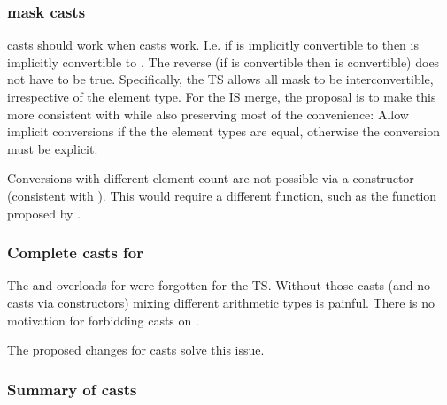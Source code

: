 \subsubsection{mask casts}
 casts should work when  casts work.
I.e. if  is implicitly convertible to 
then  is implicitly convertible to .
The reverse (if  is convertible then  is
convertible) does not have to be true.
Specifically, the TS allows all  mask to be
interconvertible, irrespective of the element type.
For the IS merge, the proposal is to make this more consistent with 
while also preserving most of the convenience:
Allow implicit conversions if the  the element types are equal,
otherwise the conversion must be explicit.

Conversions with different element count are not possible via a constructor
(consistent with ).
This would require a different function, such as the 
function proposed by \textcite{P2638R0}.

\subsubsection{Complete casts for }
The  and  overloads for  were forgotten for the TS.
Without those casts (and no casts via constructors) mixing different arithmetic types is painful.
There is no motivation for forbidding casts on .

The proposed changes for casts solve this issue.

\subsubsection{Summary of casts}


